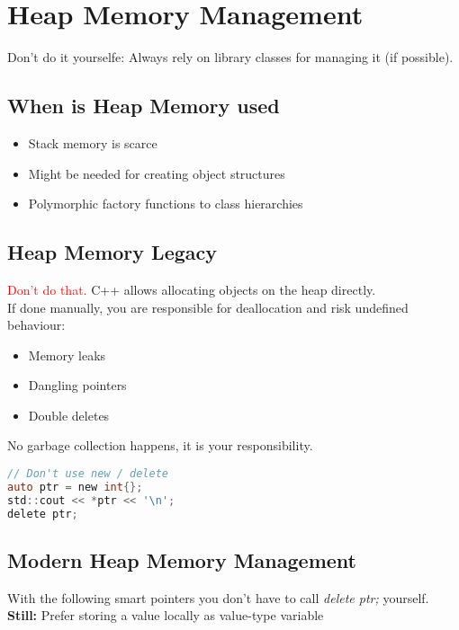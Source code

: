 
\section{Heap Memory Management}
Don't do it yourselfe: Always rely on library classes for managing it (if possible).

\subsection{When is Heap Memory used}
\begin{itemize}
    \item Stack memory is scarce
    \item Might be needed for creating object structures
    \item Polymorphic factory functions to class hierarchies
\end{itemize}

\subsection{Heap Memory Legacy}
\textcolor{red}{Don't do that.} C++ allows allocating objects on the heap directly.\\
If done manually, you are responsible for deallocation and risk undefined behaviour:
\begin{itemize}
    \item Memory leaks
    \item Dangling pointers
    \item Double deletes
\end{itemize}

No garbage collection happens, it is your responsibility.

\begin{lstlisting}[style=frame, style= linenumbers, language=C]
// Don't use new / delete
auto ptr = new int{};
std::cout << *ptr << '\n';
delete ptr;
\end{lstlisting}

\subsection{Modern Heap Memory Management}
With the following smart pointers you don't have to call \textit{delete ptr;} yourself.\\
\textbf{Still:} Prefer storing a value locally as value-type variable
